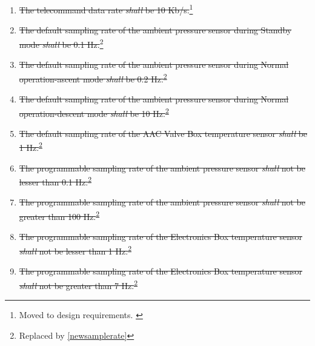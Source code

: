 \documentclass[a4paper,12pt,twoside]{article}
\providecommand{\DIFaddbegin}{} %
\providecommand{\DIFaddend}{} %
\providecommand{\DIFdelbegin}{} %
\providecommand{\DIFdelend}{} %
\newcommand{\DIFscaledelfig}{0.5}
\newlength{\DIFdelgraphicswidth} %
\newlength{\DIFdelgraphicsheight} %
\newcommand{\DIFaddincludegraphics}[2][]{{\color{blue}\fbox{\DIFOincludegraphics[#1]{#2}}}} %
\newcommand{\DIFdelincludegraphics}[2][]{%
\sbox{\DIFdelgraphicsbox}{\DIFOincludegraphics[#1]{#2}}%
\settoboxwidth{\DIFdelgraphicswidth}{\DIFdelgraphicsbox} %
\settoboxtotalheight{\DIFdelgraphicsheight}{\DIFdelgraphicsbox} %
\scalebox{\DIFscaledelfig}{%
\parbox[b]{\DIFdelgraphicswidth}{\usebox{\DIFdelgraphicsbox}\\[-\baselineskip] \rule{\DIFdelgraphicswidth}{0em}}\llap{\resizebox{\DIFdelgraphicswidth}{\DIFdelgraphicsheight}{%
\setlength{\unitlength}{\DIFdelgraphicswidth}%
\begin{picture}(1,1)%
\thicklines\linethickness{2pt} %
{\color[rgb]{1,0,0}\put(0,0){\framebox(1,1){}}}%
{\color[rgb]{1,0,0}\put(0,0){\line( 1,1){1}}}%
{\color[rgb]{1,0,0}\put(0,1){\line(1,-1){1}}}%
\end{picture}%
}\hspace*{3pt}}} %
} %
\DeclareRobustCommand{\DIFaddbegin}{\DIFOaddbegin \let\includegraphics\DIFaddincludegraphics} %
\DeclareRobustCommand{\DIFaddend}{\DIFOaddend \let\includegraphics\DIFOincludegraphics} %
\DeclareRobustCommand{\DIFdelbegin}{\DIFOdelbegin \let\includegraphics\DIFdelincludegraphics} %
\DeclareRobustCommand{\DIFdelend}{\DIFOaddend \let\includegraphics\DIFOincludegraphics} %
\begin{document}
\begin{enumerate}[label=P.\arabic*]
    \item \DIFdelbegin %
\DIFdelend \DIFaddbegin \st{The telecommand data rate \textit{shall} be 10 Kb/s.}\DIFaddend \footnote{Moved to design requirements.\DIFdelbegin %
\DIFdelend \DIFaddbegin \label{designRequirement}\DIFaddend }
    \item \st{The default sampling rate of the ambient pressure sensor during Standby mode \textit{shall} be 0.1 Hz.}\footnote{Replaced by \ref{newsamplerate}\label{replaceSampleRate}}
    \item \st{The default sampling rate of the ambient pressure sensor during Normal operation-ascent mode \textit{shall} be 0.2 Hz.}\textsuperscript{\ref{replaceSampleRate}}
    \item \st{The default sampling rate of the ambient pressure sensor during Normal operation-descent mode \textit{shall} be 10 Hz.}\textsuperscript{\ref{replaceSampleRate}}
    \item \st{The default sampling rate of the AAC Valve Box temperature sensor \textit{shall} be 1 Hz.}\textsuperscript{\ref{replaceSampleRate}}
    \item \st{The programmable sampling rate of the ambient pressure sensor \textit{shall} not be lesser than 0.1 Hz.}\textsuperscript{\ref{replaceSampleRate}}
    \item \st{The programmable sampling rate of the ambient pressure sensor \textit{shall} not be greater than 100 Hz.}\textsuperscript{\ref{replaceSampleRate}}
    \item \DIFdelbegin %
\DIFdelend \DIFaddbegin \st{The programmable sampling rate of the Electronics Box temperature sensor \textit{shall} not be lesser than 1 Hz.}\DIFaddend \textsuperscript{\ref{replaceSampleRate}}
    \item \DIFdelbegin %
\DIFdelend \DIFaddbegin \st{The programmable sampling rate of the Electronics Box temperature sensor \textit{shall} not be greater than 7 Hz.}\DIFaddend \textsuperscript{\ref{replaceSampleRate}}

\end{enumerate}
\end{document}
